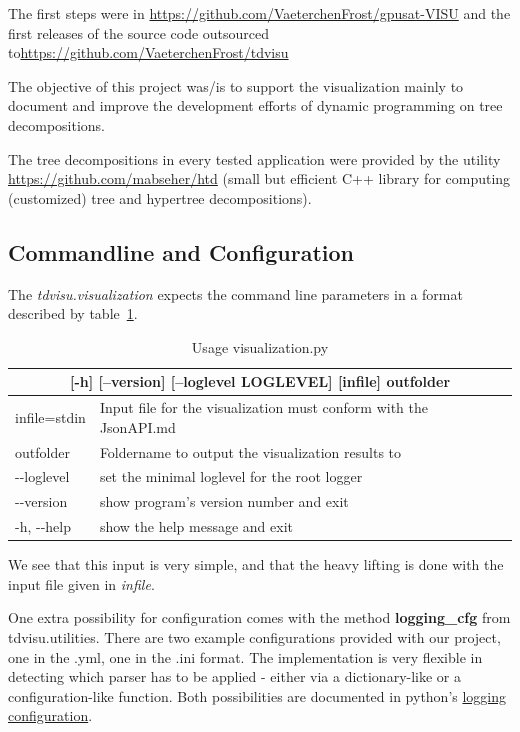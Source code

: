 \documentclass[a4paper, 12pt]{scrartcl}
\begin{document}
The first steps were in \url{https://github.com/VaeterchenFrost/gpusat-VISU} and the first releases of the source code outsourced to\url{https://github.com/VaeterchenFrost/tdvisu}

The objective of this project was/is to support the visualization mainly to document and improve the development efforts of dynamic programming on tree decompositions.

The tree decompositions in every tested application were provided by the utility \url{https://github.com/mabseher/htd} (small but efficient C++ library for computing (customized) tree and hypertree decompositions).




\subsection{Commandline and Configuration}


The \textit{tdvisu.visualization} expects the command line parameters in a format described by table~\ref{tab:optionstdvisu}.

\def\arraystretch{1.2}%
\begin{longtable}{|ll|}
	\caption{Usage visualization.py 
		\label{tab:optionstdvisu}}\\
	\hline 
	\multicolumn{2}{|c|}{[-h] [--version] [--loglevel LOGLEVEL] [infile] outfolder}
	\\[2ex]
	\endfirsthead

	infile=stdin &  Input file for the visualization must conform with the JsonAPI.md\\
	outfolder &  Foldername to output the visualization results to\\
	-{}-loglevel  &   set the minimal loglevel for the root logger\\
	-{}-version & show program's version number and exit\\
	-h, -{}-help & show the help message and exit\\
	\hline
\end{longtable}

We see that this input is very simple, and that the heavy lifting is done with the input file given in \textit{infile}.

One extra possibility for configuration comes with the method \textbf{logging\_cfg} from {tdvisu.utilities}. There are two example configurations provided with our project, one in the .yml, one in the .ini format. The implementation is very flexible in detecting which parser has to be applied - either via a dictionary-like or a configuration-like function. Both possibilities are documented in python's \href{https://docs.python.org/3/library/logging.config.html#logging-config-api}{logging configuration}.
\end{document}

